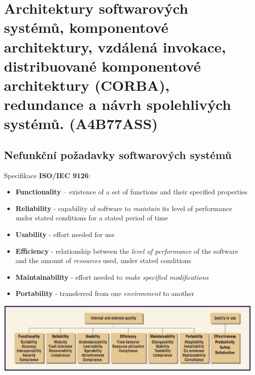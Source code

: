 \documentclass{scrreprt}
\begin{document}
\setcounter{chapter}{7}
\chapter{Architektury softwarových systémů, komponentové architektury, vzdálená invokace, distribuované komponentové architektury (CORBA), redundance a návrh spolehlivých systémů. (A4B77ASS)}

\section{Nefunkční požadavky softwarových systémů}
Specifikace \textbf{ISO/IEC 9126}:
\begin{itemize}
\item \textbf{Functionality} – existence of a set of functions and their specified properties
\item \textbf{Reliability} - capability of software to \emph{maintain} its level of performance under stated conditions for a stated period of time
\item \textbf{Usability} - effort needed for use
\item \textbf{Efficiency} - relationship between the \emph{level of performance} of the software and the amount of \emph{resources} used, under stated conditions
\item \textbf{Maintainability} - effort needed to \emph{make specified modifications}
\item \textbf{Portability} - transferred from one \emph{environment} to another
\end{itemize}

\begin{center}
\includegraphics[width=\linewidth]{img/iso}
\end{center}
\end{document}
